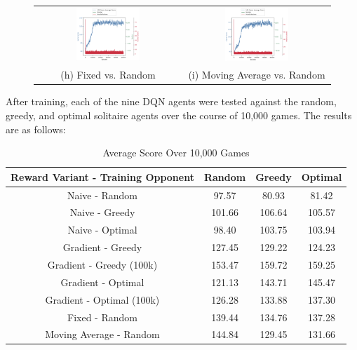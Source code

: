 \documentclass[12pt]{article}
\begin{document}
\begin{figure}[H]
    \begin{tabular}{cc}
        \includegraphics[width=0.45\textwidth]{fixed_random.png} &
        \includegraphics[width=0.45\textwidth]{flex_random.png} \\
        (h) Fixed vs. Random &
        (i) Moving Average vs. Random
    \end{tabular}
\end{figure}

\noindent
After training, each of the nine DQN agents were tested against the random, greedy, and optimal solitaire agents over the course of 10,000 games. The results are as follows:

\begin{table}[H]
    \centering
    \caption*{Average Score Over 10,000 Games}
    \begin{tabular}{ |c|c|c|c| }
        \hline
        Reward Variant - Training Opponent & Random & Greedy & Optimal \\
        \hline
        Naive - Random & 97.57 & 80.93 & 81.42 \\
        Naive - Greedy & 101.66 & 106.64 & 105.57 \\
        Naive - Optimal & 98.40 & 103.75 & 103.94 \\
        Gradient - Greedy & 127.45 & 129.22 & 124.23 \\
        Gradient - Greedy (100k) & 153.47 & 159.72 & 159.25 \\
        Gradient - Optimal & 121.13 & 143.71 & 145.47 \\
        Gradient - Optimal (100k) & 126.28 & 133.88 & 137.30 \\
        Fixed - Random & 139.44 & 134.76 & 137.28 \\
        Moving Average - Random & 144.84 & 129.45 & 131.66 \\
        \hline
    \end{tabular}
\end{table}
\end{document}
